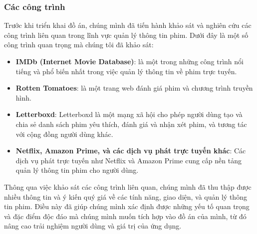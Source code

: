\documentclass[12pt]{article}
\begin{document}
\subsubsection{Các công trình}
Trước khi triển khai đồ án, chúng mình đã tiến hành khảo sát và nghiên cứu các công trình liên quan trong lĩnh vực quản lý thông tin phim. Dưới đây là một số công trình quan trọng mà chúng tôi đã khảo sát:
\begin{itemize}
    \item \textbf{IMDb (Internet Movie Database)}: là một trong những công trình nổi tiếng và phổ biến nhất trong việc quản lý thông tin về phim trực tuyến. 
    \item \textbf{Rotten Tomatoes}: là một trang web đánh giá phim và chương trình truyền hình.
    \item \textbf{Letterboxd}: Letterboxd là một mạng xã hội cho phép người dùng tạo và chia sẻ danh sách phim yêu thích, đánh giá và nhận xét phim, và tương tác với cộng đồng người dùng khác.
    \item \textbf{Netflix, Amazon Prime, và các dịch vụ phát trực tuyến khác}: Các dịch vụ phát trực tuyến như Netflix và Amazon Prime cung cấp nền tảng quản lý thông tin phim cho người dùng. 
\end{itemize}
Thông qua việc khảo sát các công trình liên quan, chúng mình đã thu thập được nhiều thông tin và ý kiến quý giá về các tính năng, giao diện, và quản lý thông tin phim. Điều này đã giúp chúng mình xác định được những yếu tố quan trọng và đặc điểm độc đáo mà chúng mình muốn tích hợp vào đồ án của mình, từ đó nâng cao trải nghiệm người dùng và giá trị của ứng dụng.
\end{document}
